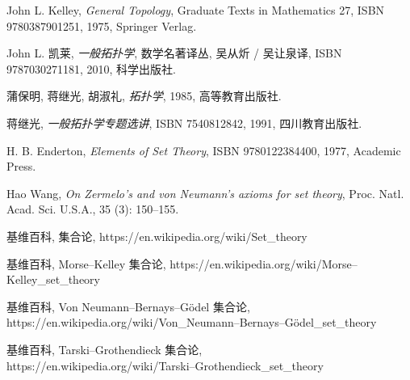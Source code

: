 \documentclass[zihao=-4,a4paper]{ctexart}
\begin{document}
	

	
\begin{thebibliography}{9}
John L. Kelley,  \emph{General Topology}, Graduate Texts in Mathematics 27, ISBN 9780387901251, 1975, Springer Verlag.
	
John L. 凯莱,  \emph{一般拓扑学}, 数学名著译丛, 吴从炘 / 吴让泉译, ISBN 9787030271181, 2010, 科学出版社.

蒲保明, 蒋继光, 胡淑礼, \emph{拓扑学}, 1985, 高等教育出版社.

蒋继光, \emph{一般拓扑学专题选讲}, ISBN 7540812842, 1991, 四川教育出版社.
	
H. B. Enderton, \emph{Elements of Set Theory}, ISBN 9780122384400, 1977, Academic Press.
	
Hao Wang, \emph{On Zermelo's and von Neumann's axioms for set theory}, Proc. Natl. Acad. Sci. U.S.A., 35 (3): 150–155.

基维百科, 集合论,	https://en.wikipedia.org/wiki/Set\_theory

基维百科, Morse–Kelley 集合论,	https://en.wikipedia.org/wiki/Morse–Kelley\_set\_theory

基维百科, Von Neumann–Bernays–Gödel  集合论,\\ https://en.wikipedia.org/wiki/Von\_Neumann–Bernays–Gödel\_set\_theory

基维百科, Tarski–Grothendieck  集合论,\\
https://en.wikipedia.org/wiki/Tarski–Grothendieck\_set\_theory

\end{thebibliography}
\end{document}
